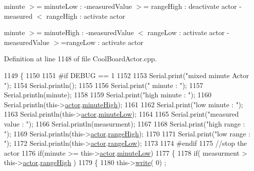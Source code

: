minute $>$= minute\+Low \+: -\/measured\+Value $>$= range\+High \+: deactivate actor -\/measured $<$ range\+High \+: activate actor

minute $>$= minute\+High \+: -\/measured\+Value $<$ range\+Low \+: activate actor -\/measured\+Value $>$=range\+Low \+: activate actor 

Definition at line 1148 of file Cool\+Board\+Actor.\+cpp.


\begin{DoxyCode}
1149 \{
1150 
1151 \textcolor{preprocessor}{#if DEBUG == 1}
1152     
1153     Serial.print(\textcolor{stringliteral}{"mixed minute Actor "});
1154     Serial.println();
1155 
1156     Serial.print(\textcolor{stringliteral}{" minute : "});
1157     Serial.println(minute);
1158 
1159     Serial.print(\textcolor{stringliteral}{"high minute : "});
1160     Serial.println(this->\hyperlink{class_cool_board_actor_a8f190db9f7a39fddbcef7f152da970e9}{actor}.\hyperlink{struct_cool_board_actor_1_1state_a4bff3d61ead74adb60be224764b93006}{minuteHigh});
1161 
1162     Serial.print(\textcolor{stringliteral}{"low minute : "});
1163     Serial.println(this->\hyperlink{class_cool_board_actor_a8f190db9f7a39fddbcef7f152da970e9}{actor}.\hyperlink{struct_cool_board_actor_1_1state_acbcc2902331fd9d757cd475eb403bdd9}{minuteLow});
1164 
1165     Serial.print(\textcolor{stringliteral}{"measured value : "});
1166     Serial.println(measurment);
1167 
1168     Serial.print(\textcolor{stringliteral}{"high range : "});
1169     Serial.println(this->\hyperlink{class_cool_board_actor_a8f190db9f7a39fddbcef7f152da970e9}{actor}.\hyperlink{struct_cool_board_actor_1_1state_a6e5cd6c5cd44e2decfd8d4df1853f8e3}{rangeHigh});
1170 
1171     Serial.print(\textcolor{stringliteral}{"low range : "});
1172     Serial.println(this->\hyperlink{class_cool_board_actor_a8f190db9f7a39fddbcef7f152da970e9}{actor}.\hyperlink{struct_cool_board_actor_1_1state_a43f891c9fb3bb63575c27cec860de55a}{rangeLow});
1173 
1174 \textcolor{preprocessor}{#endif}
1175     \textcolor{comment}{//stop the actor    }
1176     \textcolor{keywordflow}{if}(minute >= this->\hyperlink{class_cool_board_actor_a8f190db9f7a39fddbcef7f152da970e9}{actor}.\hyperlink{struct_cool_board_actor_1_1state_acbcc2902331fd9d757cd475eb403bdd9}{minuteLow})
1177     \{
1178             \textcolor{keywordflow}{if}( measurment > this->\hyperlink{class_cool_board_actor_a8f190db9f7a39fddbcef7f152da970e9}{actor}.\hyperlink{struct_cool_board_actor_1_1state_a6e5cd6c5cd44e2decfd8d4df1853f8e3}{rangeHigh} )
1179             \{
1180                 this->\hyperlink{class_cool_board_actor_a958786ff01ea1056ee72c72d439f86da}{write}( 0) ;

\end{DoxyCode}

